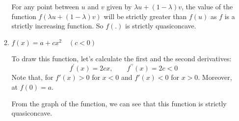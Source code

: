\documentclass{./../../Latex/homework}
\begin{document}
\begin{enumerate}
\begin{enumerate}
For any point between $u$ and $v$ given by $\lambda u+(1-\lambda) v$, the value of the function 
$f(\lambda u+(1-\lambda) v)$ will be strictly greater than $f(u)$ as $f$ is a strictly increasing function. So $f(.)$ is strictly quasiconcave.  
\item $f(x) = a+c x^2 \quad (c<0) $ 

To draw this function, let's calculate the first and the second derivatives:
$$ f^{\prime}(x)=2 c x, \quad \quad f^{\prime \prime}(x)=2 c<0 $$
Note that, for $f'(x)>0$ for $x<0$ and $f'(x)<0$ for $x>0$. Moreover, at $f(0) = a $. 

\begin{center}
\end{center}
From the graph of the function, we can see that this function is strictly quasiconcave.
\end{enumerate}


\end{enumerate}
\end{document}
